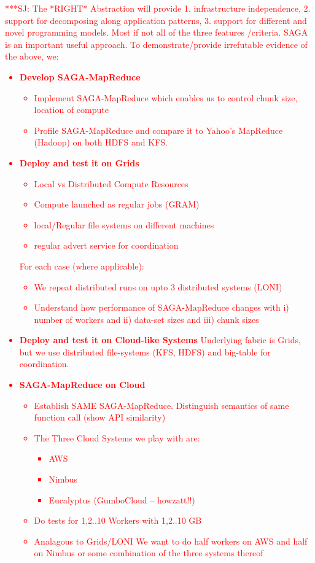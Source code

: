 \documentclass[conference,final]{IEEEtran}
\newcommand{\jhanote}[1]{ {\textcolor{red} { ***SJ: #1 }}}
\newcommand{\jhanote}[1]{}
\begin{document}
\jhanote{The *RIGHT* Abstraction will provide 1. infrastructure
  independence, 2. support for decomposing along application patterns,
  3. support for different and novel programming models. Most if not
  all of the three features /criteria. SAGA is an important useful
  approach.  To demonstrate/provide irrefutable evidence of the above,
  we:

\begin{itemize}
\item {\bf Develop SAGA-MapReduce }

  \begin{itemize}
  \item Implement SAGA-MapReduce which enables us to control chunk
    size, location of compute
  \item Profile SAGA-MapReduce and compare it to Yahoo's MapReduce
    (Hadoop) on both HDFS and KFS.
  \end{itemize}

\item {\bf Deploy and test it on Grids}
  \begin{itemize}
  \item Local vs Distributed Compute Resources
  \item Compute launched as regular jobs (GRAM)
  \item local/Regular file systems on different machines
  \item regular advert service for coordination
  \end{itemize}

For each case (where applicable):
  \begin{itemize}
  \item We repeat distributed runs on upto 3 distributed systems
    (LONI)
  \item Understand how performance of SAGA-MapReduce changes with i)
    number of workers and ii) data-set sizes and iii) chunk sizes
  \end{itemize}

\item {\bf Deploy and test it on Cloud-like Systems} Underlying fabric
  is Grids, but we use distributed file-systems (KFS, HDFS) and
  big-table for coordination.
\item {\bf SAGA-MapReduce on Cloud}
  \begin{itemize}
  \item Establish SAME SAGA-MapReduce. Distinguish semantics of same
    function call (show API similarity)
  \item The Three Cloud Systems we play with are:
    \begin{itemize}
    \item AWS
    \item Nimbus
    \item Eucalyptus (GumboCloud -- howzatt!!)
    \end{itemize}
  \item Do tests for 1,2..10 Workers with 1,2..10 GB
  \item Analagous to Grids/LONI We want to do half workers on AWS and
    half on Nimbus or some combination of the three systems thereof
  \end{itemize}
\end{itemize}

}
\end{document}
